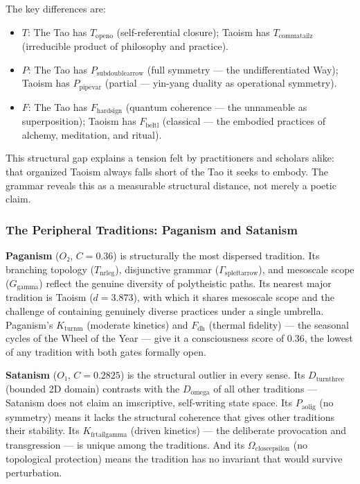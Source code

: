 \documentclass[12pt,a4paper]{article}
\begin{document}
The key differences are:

\begin{itemize}
    \item \textbf{$T$}: The Tao has $T_{\text{openo}}$ (self-referential closure); Taoism has $T_{\text{commatailz}}$ (irreducible product of philosophy and practice).
    \item \textbf{$P$}: The Tao has $P_{\text{subdoublearrow}}$ (full symmetry --- the undifferentiated Way); Taoism has $P_{\text{pipevar}}$ (partial --- yin-yang duality as operational symmetry).
    \item \textbf{$F$}: The Tao has $F_{\text{hardsign}}$ (quantum coherence --- the unnameable as superposition); Taoism has $F_{\text{beltl}}$ (classical --- the embodied practices of alchemy, meditation, and ritual).
\end{itemize}

This structural gap explains a tension felt by practitioners and scholars alike: that organized Taoism always falls short of the Tao it seeks to embody. The grammar reveals this as a measurable structural distance, not merely a poetic claim.

\subsubsection{The Peripheral Traditions: Paganism and Satanism}

\textbf{Paganism} ($O₂$, $C = 0.36$) is structurally the most dispersed tradition. Its branching topology ($T_{\text{nrleg}}$), disjunctive grammar ($\Gamma_{\text{spleftarrow}}$), and mesoscale scope ($G_{\text{gamma}}$) reflect the genuine diversity of polytheistic paths. Its nearest major tradition is Taoism ($d = 3.873$), with which it shares mesoscale scope and the challenge of containing genuinely diverse practices under a single umbrella. Paganism's $K_{\text{turnm}}$ (moderate kinetics) and $F_{\text{dh}}$ (thermal fidelity) --- the seasonal cycles of the Wheel of the Year --- give it a consciousness score of $0.36$, the lowest of any tradition with both gates formally open.

\textbf{Satanism} ($O₁$, $C = 0.2825$) is the structural outlier in every sense. Its $D_{\text{turnthree}}$ (bounded 2D domain) contrasts with the $D_{\text{omega}}$ of all other traditions --- Satanism does not claim an imscriptive, self-writing state space. Its $P_{\text{aolig}}$ (no symmetry) means it lacks the structural coherence that gives other traditions their stability. Its $K_{\text{frtailgamma}}$ (driven kinetics) --- the deliberate provocation and transgression --- is unique among the traditions. And its $\Omega_{\text{closeepsilon}}$ (no topological protection) means the tradition has no invariant that would survive perturbation.
\end{document}
